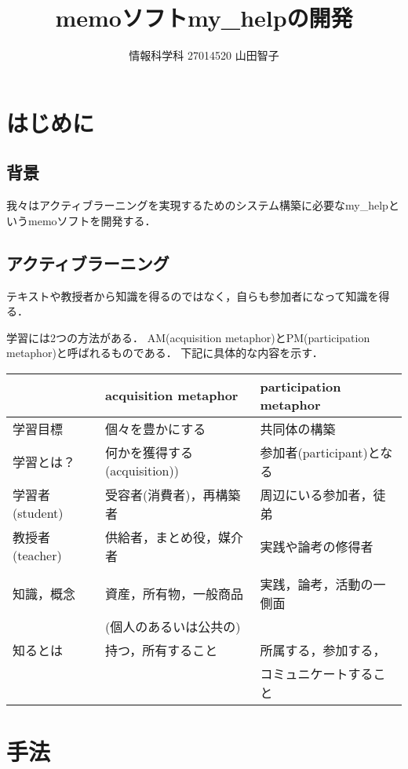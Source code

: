 \documentclass[a4j,twocolumn]{jsarticle}
\title{memoソフトmy\_helpの開発}
\author{情報科学科 \hspace{5mm} 27014520 \hspace{5mm} 山田智子}
\date{}
\begin{document}
\maketitle



\section{はじめに}
\label{sec-1}
\subsection{背景}
\label{sec-1-1}
我々はアクティブラーニングを実現するためのシステム構築に必要なmy\_helpというmemoソフトを開発する．



\subsection{アクティブラーニング}
\label{sec-1-2}
テキストや教授者から知識を得るのではなく，自らも参加者になって知識を得る．

学習には2つの方法がある．
AM(acquisition metaphor)とPM(participation metaphor)と呼ばれるものである．
下記に具体的な内容を示す．

\begin{center}
\begin{tabular}{lll}
 & acquisition metaphor & participation metaphor\\
\hline
学習目標 & 個々を豊かにする & 共同体の構築\\
\hline
学習とは？ & 何かを獲得する(acquisition)) & 参加者(participant)となる\\
\hline
学習者(student) & 受容者(消費者)，再構築者　 & 周辺にいる参加者，徒弟\\
\hline
教授者(teacher) & 供給者，まとめ役，媒介者 & 実践や論考の修得者\\
 &  & \\
\hline
知識，概念 & 資産，所有物，一般商品 & 実践，論考，活動の一側面\\
 & (個人のあるいは公共の) & \\
\hline
知るとは & 持つ，所有すること & 所属する，参加する，\\
 &  & コミュニケートすること\\
\hline
\end{tabular}
\end{center}



\section{手法}
\label{sec-2}
\end{document}
